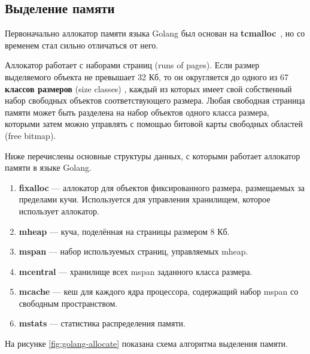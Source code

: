 \subsection{Выделение памяти}

Первоначально аллокатор памяти языка Golang был основан на \textbf{tcmalloc}~\cite{tcmalloc}, но со временем стал сильно отличаться от него. \cite{golang_malloc} 

Аллокатор работает с наборами страниц (runs of pages). Если размер выделяемого объекта не превышает 32 Кб, то он округляется до одного из 67 \textbf{классов размеров} (size classes) \cite{golang_size_classes}, каждый из которых имеет свой собственный набор свободных объектов соответствующего размера. Любая свободная страница памяти может быть разделена на набор объектов одного класса размера, которыми затем можно управлять с помощью битовой карты свободных областей (free bitmap). \cite{golang_malloc}

Ниже перечислены основные структуры данных, с которыми работает аллокатор памяти в языке Golang. \cite{golang_malloc}

\begin{enumerate}[label*=\arabic*.]
	\item \textbf{fixalloc} \cite{golang_fixalloc} --- аллокатор для объектов фиксированного размера, размещаемых за пределами кучи. Используется для управления хранилищем, которое использует аллокатор.
	\item \textbf{mheap} --- куча, поделённая на страницы размером 8 Кб.
	\item \textbf{mspan} --- набор используемых страниц, управляемых mheap.
	\item \textbf{mcentral} --- хранилище всех mspan заданного класса размера.
	\item \textbf{mcache} --- кеш для каждого ядра процессора, содержащий набор mspan со свободным пространством.
	\item \textbf{mstats} --- статистика распределения памяти.
\end{enumerate}

На рисунке \ref{fig:golang-allocate} показана схема алгоритма выделения памяти.

